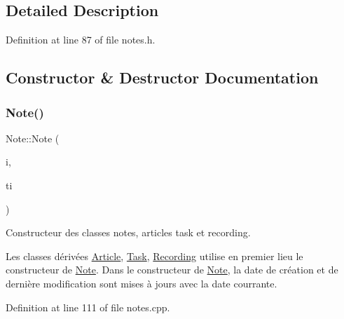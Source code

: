\subsection{Detailed Description}


Definition at line 87 of file notes.\+h.



\subsection{Constructor \& Destructor Documentation}
\mbox{\label{class_note_a0490153115307d5f59974d7000260e48}} 
\subsubsection{\texorpdfstring{Note()}{Note()}\hspace{0.1cm}{\footnotesize\ttfamily [1/2]}}
{\footnotesize\ttfamily Note\+::\+Note (\begin{DoxyParamCaption}\item[{const Q\+String \&}]{i,  }\item[{const Q\+String \&}]{ti }\end{DoxyParamCaption})}



Constructeur des classes notes, articles task et recording. 

Les classes dérivées \hyperlink{class_article}{Article}, \hyperlink{class_task}{Task}, \hyperlink{class_recording}{Recording} utilise en premier lieu le constructeur de \hyperlink{class_note}{Note}. Dans le constructeur de \hyperlink{class_note}{Note}, la date de création et de dernière modification sont mises à jours avec la date courrante. 

Definition at line 111 of file notes.\+cpp.

